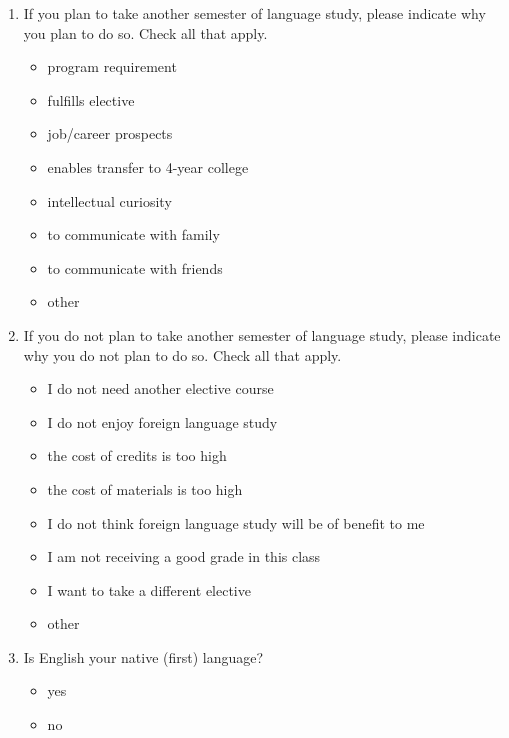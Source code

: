 \documentclass[letterpaper,10pt]{article}
\begin{document}
\begin{enumerate}[resume]
\item \label{LangPlanYes}If you plan to take another semester of language study, please indicate why you plan to do so.  Check all that apply. 
\vspace{-0.1in}\begin{multicols}{2}
\begin{itemize}
	\item program requirement
	\item fulfills elective
	\item job/career prospects
	\item enables transfer to 4-year college
	\item intellectual curiosity
	\item to communicate with family
	\item to communicate with friends
	\item other \underline{\hspace{2in}}
\end{itemize}
\end{multicols}

\item \label{LangPlanNo}If you do not plan to take another semester of language study, please indicate why you do not plan to do so. Check all that apply.
\vspace{-0.1in}\begin{multicols}{2}
\begin{itemize}
	\item I do not need another elective course
	\item I do not enjoy foreign language study
	\item the cost of credits is too high
	\item the cost of materials is too high
	\item I do not think foreign language study will be of benefit to me
	\item I am not receiving a good grade in this class
	\item I want to take a different elective
	\item other \underline{\hspace{2in}}
\end{itemize}
\end{multicols}

\item Is English your native (first) language?
\vspace{-0.1in}\begin{multicols}{2}
\begin{itemize}
	\item yes
	\item no
\end{itemize}
\end{multicols}


\end{enumerate}
\end{document}
